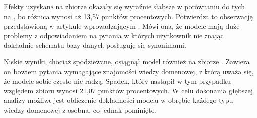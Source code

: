 
Efekty uzyskane na zbiorze  okazały się wyraźnie słabsze w porównaniu do tych na , bo różnica wynosi aż 13,57 punktów procentowych. Potwierdza to obserwację przedstawioną w artykule wprowadzającym . Mówi ona, że modele mają duże problemy z odpowiadaniem na pytania w których użytkownik nie znając dokładnie schematu bazy danych posługuję się synonimami.

Niskie wyniki, chociaż spodziewane, osiągnął model również na zbiorze . Zawiera on bowiem pytania wymagające znajomości wiedzy domenowej, z którą uważa się, że modele sobie często nie radzą. Spadek, który nastąpił w tym przypadku względem zbioru  wynosi 21,07 punktów procentowych. W celu dokonania głębszej analizy możliwe jest obliczenie dokładności modelu w obrębie każdego typu wiedzy domenowej z osobna, co jednak pominięto.